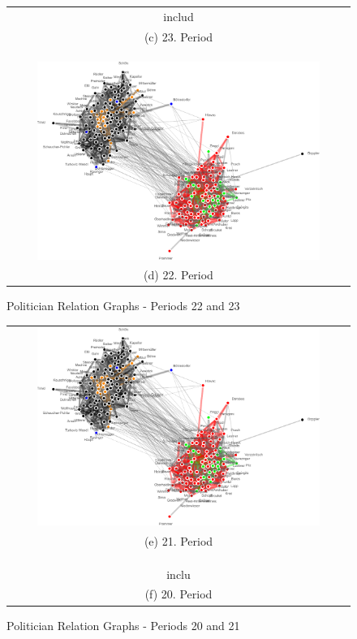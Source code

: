 \begin{figure}
\center
\begin{tabular}{ c }
	includ
	\\
	(c) 23. Period
	\\
	
	\\
	\hline
	\\
	\\ \includegraphics[width=0.85\textwidth]{imgs/graphs/politician-graphs/horizontal/graph_22.eps}
	\\
	(d) 22. Period
	
\end{tabular}
	
	
	\caption{Politician Relation Graphs - Periods 22 and 23}
	\label{fig:pol_graphs_22_23}
\end{figure}

\begin{figure}
\center
\begin{tabular}{ c }
	\includegraphics[width=0.85\textwidth]{imgs/graphs/politician-graphs/horizontal/graph_22.eps}
	\\
	(e) 21. Period
	\\
	
	\\
	\hline
	\\
	\\ inclu
	\\
	(f) 20. Period
	
\end{tabular}
	
	
	\caption{Politician Relation Graphs - Periods 20 and 21}
	\label{fig:pol_graphs_20_21}
\end{figure}